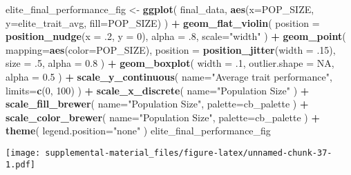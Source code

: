 \documentclass[]{book}
\newenvironment{Shaded}{\begin{snugshade}}{\end{snugshade}}
\newcommand{\DataTypeTok}[1]{\textcolor[rgb]{0.13,0.29,0.53}{#1}}
\newcommand{\DecValTok}[1]{\textcolor[rgb]{0.00,0.00,0.81}{#1}}
\newcommand{\FloatTok}[1]{\textcolor[rgb]{0.00,0.00,0.81}{#1}}
\newcommand{\KeywordTok}[1]{\textcolor[rgb]{0.13,0.29,0.53}{\textbf{#1}}}
\newcommand{\NormalTok}[1]{#1}
\newcommand{\OperatorTok}[1]{\textcolor[rgb]{0.81,0.36,0.00}{\textbf{#1}}}
\newcommand{\OtherTok}[1]{\textcolor[rgb]{0.56,0.35,0.01}{#1}}
\newcommand{\StringTok}[1]{\textcolor[rgb]{0.31,0.60,0.02}{#1}}
\begin{document}
\begin{Shaded}
\begin{Highlighting}[]
\NormalTok{elite_final_performance_fig <-}\StringTok{ }\KeywordTok{ggplot}\NormalTok{(}
\NormalTok{    final_data,}
    \KeywordTok{aes}\NormalTok{(}\DataTypeTok{x=}\NormalTok{POP_SIZE, }\DataTypeTok{y=}\NormalTok{elite_trait_avg, }\DataTypeTok{fill=}\NormalTok{POP_SIZE)}
\NormalTok{  ) }\OperatorTok{+}
\StringTok{  }\KeywordTok{geom_flat_violin}\NormalTok{(}
    \DataTypeTok{position =} \KeywordTok{position_nudge}\NormalTok{(}\DataTypeTok{x =} \FloatTok{.2}\NormalTok{, }\DataTypeTok{y =} \DecValTok{0}\NormalTok{),}
    \DataTypeTok{alpha =} \FloatTok{.8}\NormalTok{,}
    \DataTypeTok{scale=}\StringTok{"width"}
\NormalTok{  ) }\OperatorTok{+}
\StringTok{  }\KeywordTok{geom_point}\NormalTok{(}
    \DataTypeTok{mapping=}\KeywordTok{aes}\NormalTok{(}\DataTypeTok{color=}\NormalTok{POP_SIZE),}
    \DataTypeTok{position =} \KeywordTok{position_jitter}\NormalTok{(}\DataTypeTok{width =} \FloatTok{.15}\NormalTok{),}
    \DataTypeTok{size =} \FloatTok{.5}\NormalTok{,}
    \DataTypeTok{alpha =} \FloatTok{0.8}
\NormalTok{  ) }\OperatorTok{+}
\StringTok{  }\KeywordTok{geom_boxplot}\NormalTok{(}
    \DataTypeTok{width =} \FloatTok{.1}\NormalTok{,}
    \DataTypeTok{outlier.shape =} \OtherTok{NA}\NormalTok{,}
    \DataTypeTok{alpha =} \FloatTok{0.5}
\NormalTok{  ) }\OperatorTok{+}
\StringTok{  }\KeywordTok{scale_y_continuous}\NormalTok{(}
    \DataTypeTok{name=}\StringTok{"Average trait performance"}\NormalTok{,}
    \DataTypeTok{limits=}\KeywordTok{c}\NormalTok{(}\DecValTok{0}\NormalTok{, }\DecValTok{100}\NormalTok{)}
\NormalTok{  ) }\OperatorTok{+}
\StringTok{  }\KeywordTok{scale_x_discrete}\NormalTok{(}
    \DataTypeTok{name=}\StringTok{"Population Size"}
\NormalTok{  ) }\OperatorTok{+}
\StringTok{  }\KeywordTok{scale_fill_brewer}\NormalTok{(}
    \DataTypeTok{name=}\StringTok{"Population Size"}\NormalTok{,}
    \DataTypeTok{palette=}\NormalTok{cb_palette}
\NormalTok{  ) }\OperatorTok{+}
\StringTok{  }\KeywordTok{scale_color_brewer}\NormalTok{(}
    \DataTypeTok{name=}\StringTok{"Population Size"}\NormalTok{,}
    \DataTypeTok{palette=}\NormalTok{cb_palette}
\NormalTok{  ) }\OperatorTok{+}
\StringTok{  }\KeywordTok{theme}\NormalTok{(}
    \DataTypeTok{legend.position=}\StringTok{"none"}
\NormalTok{  )}
\NormalTok{elite_final_performance_fig}
\end{Highlighting}
\end{Shaded}

\texttt{[image: supplemental-material\_files/figure-latex/unnamed-chunk-37-1.pdf]}
\end{document}
